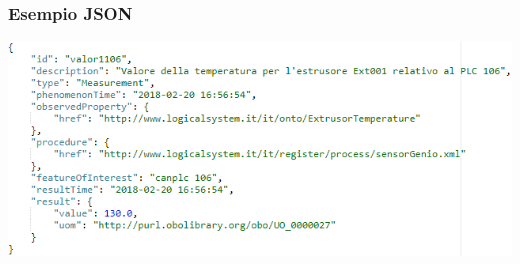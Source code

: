 \documentclass{beamer}
\begin{document}




\begin{frame}
\frametitle{Esempio JSON}
\includegraphics[width=1\textwidth]{images/TemperatureJSON.png}
\end{frame}

%
%
\end{document}
